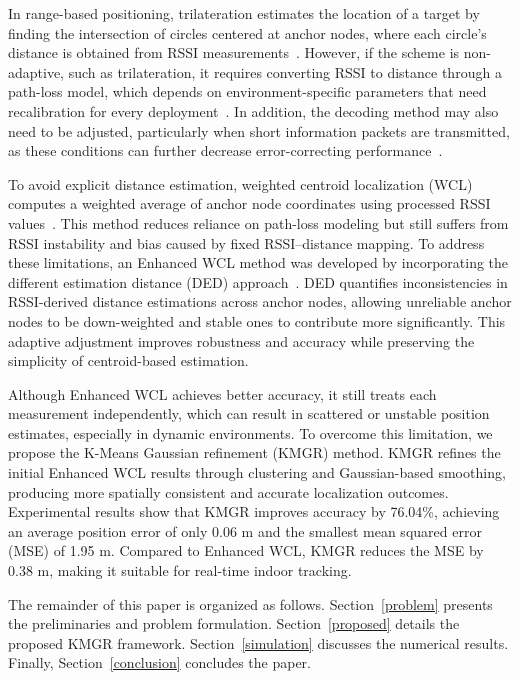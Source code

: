 \documentclass[journal]{IEEEtran}
\begin{document}
In range-based positioning, trilateration estimates the location of a target by finding the intersection of circles centered at anchor nodes, where each circle’s distance is obtained from RSSI measurements~\cite{trilat}.
However, if the scheme is non-adaptive, such as trilateration, it requires converting RSSI to distance through a path-loss model, which depends on environment-specific parameters that need recalibration for every deployment~\cite{adaptive}. In addition, the decoding method may also need to be adjusted, particularly when short information packets are transmitted, as these conditions can further decrease error-correcting performance~\cite{trapping}.

To avoid explicit distance estimation, weighted centroid localization (WCL) computes a weighted average of anchor node coordinates using processed RSSI values~\cite{hybrid}. This method reduces reliance on path-loss modeling but still suffers from RSSI instability and bias caused by fixed RSSI–distance mapping. 
To address these limitations, an Enhanced WCL method was developed by incorporating the different estimation distance (DED) approach~\cite{hybrid,adaptive}. DED quantifies inconsistencies in RSSI-derived distance estimations across anchor nodes, allowing unreliable anchor nodes to be down-weighted and stable ones to contribute more significantly. This adaptive adjustment improves robustness and accuracy while preserving the simplicity of centroid-based estimation.

Although Enhanced WCL achieves better accuracy, it still treats each measurement independently, which can result in scattered or unstable position estimates, especially in dynamic environments. To overcome this limitation, we propose the K-Means Gaussian refinement (KMGR) method. KMGR refines the initial Enhanced WCL results through clustering and Gaussian-based smoothing, producing more spatially consistent and accurate localization outcomes. Experimental results show that KMGR improves accuracy by 76.04\%, achieving an average position error of only 0.06 m and the smallest mean squared error (MSE) of 1.95 m. Compared to Enhanced WCL, KMGR reduces the MSE by 0.38 m, making it suitable for real-time indoor tracking.

The remainder of this paper is organized as follows. Section~\ref{problem} presents the preliminaries and problem formulation. Section~\ref{proposed} details the proposed KMGR framework.  Section~\ref{simulation} discusses the numerical results. Finally, Section~\ref{conclusion} concludes the paper.
\end{document}
